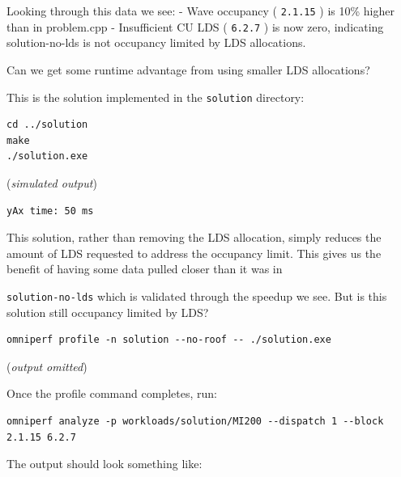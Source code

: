 \documentclass[
]{article}
\let\oldtexttt\texttt
\renewcommand{\texttt}[1]{
  \colorbox{Light}{\oldtexttt{#1}}
}
\begin{document}
Looking through this data we see: - Wave occupancy (\texttt{2.1.15}) is
10\% higher than in problem.cpp - Insufficient CU LDS (\texttt{6.2.7})
is now zero, indicating solution-no-lds is not occupancy limited by LDS
allocations.

Can we get some runtime advantage from using smaller LDS allocations?

This is the solution implemented in the \texttt{solution} directory:

\begin{verbatim}
cd ../solution
make
./solution.exe
\end{verbatim}

(\emph{simulated output})

\begin{verbatim}
yAx time: 50 ms
\end{verbatim}

This solution, rather than removing the LDS allocation, simply reduces
the amount of LDS requested to address the occupancy limit. This gives
us the benefit of having some data pulled closer than it was in
\texttt{solution-no-lds} which is validated through the speedup we see.
But is this solution still occupancy limited by LDS?

\begin{verbatim}
omniperf profile -n solution --no-roof -- ./solution.exe
\end{verbatim}

(\emph{output omitted})

Once the profile command completes, run:

\begin{verbatim}
omniperf analyze -p workloads/solution/MI200 --dispatch 1 --block 2.1.15 6.2.7
\end{verbatim}

The output should look something like:
\end{document}
